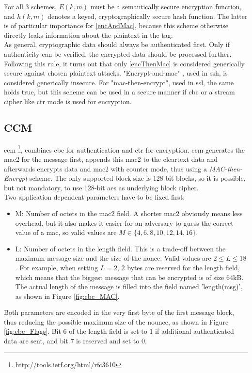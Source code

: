 For all 3 schemes, $E(k, m)$ must be a semantically secure encryption function, and $h(k, m)$ denotes a keyed, cryptographically secure hash function.
The latter is of particular importance for \ref{encAndMac}, because this scheme otherwise directly leaks information about the plaintext in the tag. 
\\
As general, cryptographic data should always be authenticated first. Only if authenticity can be verified,
the encrypted data should be processed further.
Following this rule, it turns out that only \ref{encThenMac} is considered generically secure against chosen plaintext attacks.
"Encrypt-and-mac" \cite{sshBellare}, used in \gls{ssh}, is considered generically
insecure. For "mac-then-encrypt", used in \gls{ssl}, the same holds true, but this scheme can be used in a secure manner if \gls{cbc} or a stream cipher like 
\gls{ctr} mode is used for encryption.

\subsection{CCM}

\gls{ccm} \footnote{http://tools.ietf.org/html/rfc3610}, combines \gls{cbc} for authentication and \gls{ctr} for encryption.
\gls{ccm} generates the \gls{mac2} for the message first, appends this \gls{mac2} to the cleartext data and afterwards encrypts data and \gls{mac2} with counter mode, thus using a
\textit{MAC-then-Encrypt} scheme. The only supported block size is 128-bit blocks, so it is possible, but not mandatory, to use 128-bit \gls{aes} as underlying block cipher.
\\
Two application dependent parameters have to be fixed first: 
\begin{itemize}
 \item M: Number of octets in the \gls{mac2} field. A shorter \gls{mac2} obviously means less overhead, but it also makes it easier for an adversary to guess the correct
 value of a \gls{mac}, so valid values are $M \in \{4, 6, 8, 10, 12, 14, 16\}$. 
 \item L: Number of octets in the length field. This is a trade-off between the maximum message size and the size of the nonce. Valid values are $2 \leq L \leq 18$.
 For example, when setting $L = 2$, 2 bytes are reserved for the length field, which means that the biggest message that can be encrypted is of size 64kB. The actual
 length of the message is filled into the field named 'length(msg)', as shown in Figure \ref{fig:cbc_MAC}.
\end{itemize}
Both parameters are encoded in the very first byte of the first message block, thus reducing the possible maximum size of the nounce, as shown in Figure \ref{fig:cbc_Flags}.
Bit 6 of the length field is set to 1 if additional authenticated data are sent, and bit 7 is reserved and set to 0.


